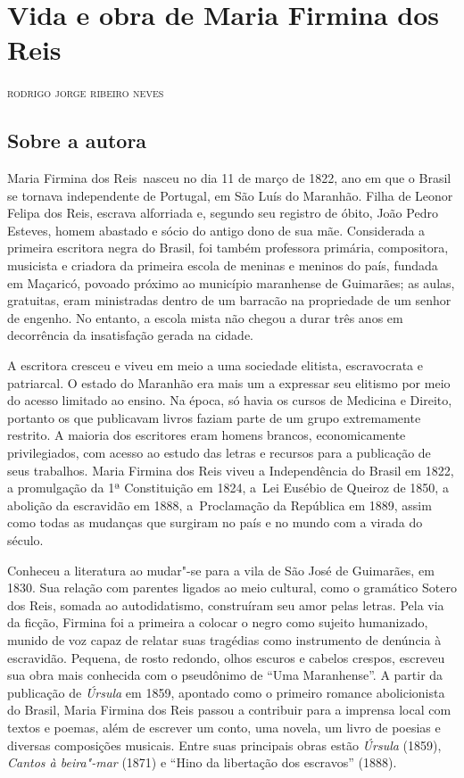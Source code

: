 \chapter{Vida e obra de Maria Firmina dos Reis}

\begin{flushright}
\textsc{rodrigo jorge ribeiro neves}
\end{flushright}
\medskip

\section{Sobre a autora}

\noindent{}Maria Firmina dos Reis~nasceu no dia 11 de março de 1822, ano
em que o Brasil se tornava independente de Portugal, em São Luís do
Maranhão. Filha de Leonor Felipa dos Reis, escrava alforriada e, segundo
seu registro de óbito, João Pedro Esteves, homem abastado e sócio do
antigo dono de sua mãe. Considerada a primeira escritora negra do
Brasil, foi também professora primária, compositora, musicista e
criadora da primeira escola de meninas e meninos do país, fundada em
Maçaricó, povoado próximo ao município maranhense de Guimarães; as
aulas, gratuitas, eram ministradas dentro de um barracão na propriedade
de um senhor de engenho. No entanto, a escola mista não chegou a durar
três anos em decorrência da insatisfação gerada na cidade.

A escritora cresceu e viveu em meio a uma
sociedade elitista, escravocrata e patriarcal. O estado do Maranhão era
mais um a expressar seu elitismo por meio do acesso limitado ao ensino.
Na época, só havia os cursos de Medicina e Direito, portanto os que
publicavam livros faziam parte de um grupo extremamente restrito. A
maioria dos escritores eram homens brancos, economicamente
privilegiados, com acesso ao estudo das letras e recursos para a
publicação de seus trabalhos. Maria Firmina dos Reis viveu a
Independência do Brasil em 1822, a promulgação da 1ª Constituição em
1824, a~Lei Eusébio de Queiroz de 1850, a abolição da escravidão em
1888, a~Proclamação da República em 1889, assim como todas as mudanças
que surgiram no país e no mundo com a virada do século.

Conheceu a literatura ao mudar"-se para a vila de São José
de Guimarães, em 1830. Sua relação com parentes ligados ao meio
cultural, como o gramático Sotero dos Reis, somada ao autodidatismo,
construíram seu amor pelas letras. Pela via da ficção, Firmina foi a
primeira a colocar o negro como sujeito humanizado, munido de voz capaz
de relatar suas tragédias como instrumento de denúncia à escravidão.
Pequena, de rosto redondo, olhos escuros e cabelos crespos, escreveu sua
obra mais conhecida com o pseudônimo de ``Uma Maranhense''. A partir da
publicação de \emph{Úrsula} em 1859, apontado como o primeiro romance
abolicionista do Brasil, Maria Firmina dos Reis passou a contribuir para
a imprensa local com textos e poemas, além de escrever um conto, uma
novela, um livro de poesias e diversas composições musicais. Entre suas
principais obras estão \emph{Úrsula} (1859), \emph{Cantos à beira"-mar}
(1871) e ``Hino da libertação dos escravos'' (1888).

